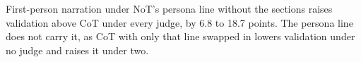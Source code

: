 First-person narration under NoT's persona line without the sections raises
validation above CoT under every judge, by 6.8 to 18.7 points.
The persona line does not carry it, as CoT with only that line
swapped in lowers validation under no judge and raises it under two.
